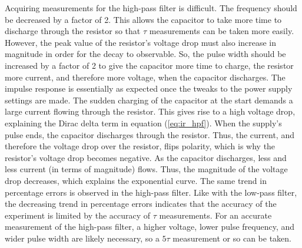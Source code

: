 Acquiring measurements for the high-pass filter is difficult. The frequency should be decreased by a factor of 2. This allows the capacitor to take more time to discharge through the resistor so that $\tau$ measurements can be taken more easily. However, the peak value of the resistor's voltage drop must also increase in magnitude in order for the decay to observable. So, the pulse width should be increased by a factor of 2 to give the capacitor more time to charge, the resistor more current, and therefore more voltage, when the capacitor discharges.
The impulse response is essentially as expected once the tweaks to the power supply settings are made. The sudden charging of the capacitor at the start demands a large current flowing through the resistor. This gives rise to a high voltage drop, explaining the Dirac delta term in equation (\ref{eq:ir_hpf}).
When the supply's pulse ends, the capacitor discharges through the resistor. Thus, the current, and therefore the voltage drop over the resistor, flips polarity, which is why the resistor's voltage drop becomes negative. As the capacitor discharges, less and less current (in terms of magnitude) flows. Thus, the magnitude of the voltage drop decreases, which explains the exponential curve.
The same trend in percentage errors is observed in the high-pass filter. Like with the low-pass filter, the decreasing trend in percentage errors indicates that the accuracy of the experiment is limited by the accuracy of $\tau$ measurements. For an accurate measurement of the high-pass filter, a higher voltage, lower pulse frequency, and wider pulse width are likely necessary, so a $5\tau$ measurement or so can be taken.
